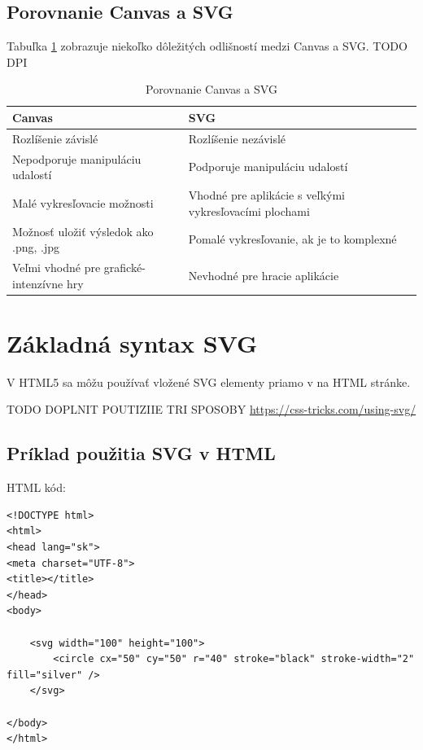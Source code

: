  
 \subsection{Porovnanie Canvas a SVG}
 Tabuľka \ref{canvas:SVG} zobrazuje niekoľko dôležitých odlišností medzi Canvas a SVG. 
 TODO DPI
 \begin{table}[h]
 \centering
 \begin{tabular}{|l|p{7.5cm} |}
 	\hline Canvas & SVG \\
 	 	\hline Rozlíšenie závislé & Rozlíšenie nezávislé \\ 
 	\hline Nepodporuje manipuláciu udalostí & Podporuje manipuláciu udalostí \\ 
 	\hline Malé vykresľovacie možnosti & Vhodné pre aplikácie s veľkými vykresľovacími plochami \\ 
 	\hline Možnosť uložiť výsledok ako .png, .jpg & Pomalé vykresľovanie, ak je to komplexné \\ 
 	\hline Veľmi vhodné pre grafické-intenzívne hry & Nevhodné pre hracie aplikácie \\ 
 	\hline 
 \end{tabular} 

 \caption{Porovnanie Canvas a SVG}
 \label{canvas:SVG}
 
\end{table}
 
 
 \section{Základná syntax \acs*{SVG}}

V HTML5 sa môžu používať vložené SVG elementy priamo v na HTML stránke. 

TODO DOPLNIT POUTIZIIE TRI SPOSOBY \url{https://css-tricks.com/using-svg/}

\subsection{Príklad použitia SVG v HTML }

HTML kód: 

\begin{lstlisting}
<!DOCTYPE html>
<html>
<head lang="sk">
<meta charset="UTF-8">
<title></title>
</head>
<body>

	<svg width="100" height="100">
		<circle cx="50" cy="50" r="40" stroke="black" stroke-width="2" fill="silver" />
	</svg>	
	
</body>
</html>

\end{lstlisting}


